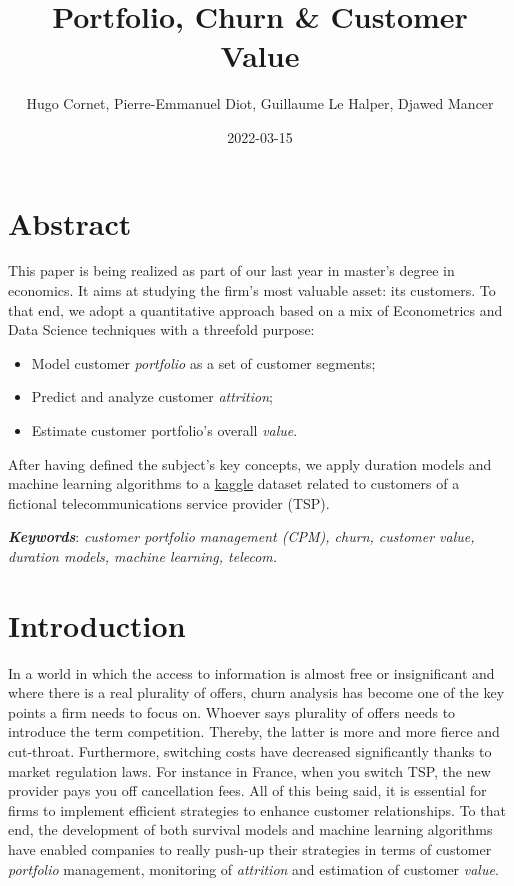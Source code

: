 \documentclass[
]{book}
\title{Portfolio, Churn \& Customer Value}
\author{Hugo Cornet, Pierre-Emmanuel Diot, Guillaume Le Halper, Djawed Mancer}
\date{2022-03-15}
\providecommand{\tightlist}{%
  \setlength{\itemsep}{0pt}\setlength{\parskip}{0pt}}
\begin{document}
\maketitle

{
\setcounter{tocdepth}{1}
\tableofcontents
}
\hypertarget{abstract}{%
\chapter*{Abstract}\label{abstract}}

This paper is being realized as part of our last year in master's degree in economics. It aims at studying the firm's most valuable asset: its customers. To that end, we adopt a quantitative approach based on a mix of Econometrics and Data Science techniques with a threefold purpose:

\begin{itemize}
\tightlist
\item
  Model customer \emph{portfolio} as a set of customer segments;
\item
  Predict and analyze customer \emph{attrition};
\item
  Estimate customer portfolio's overall \emph{value}.
\end{itemize}

After having defined the subject's key concepts, we apply duration models and machine learning algorithms to a \href{https://www.kaggle.com/yeanzc/telco-customer-churn-ibm-dataset}{kaggle} dataset related to customers of a fictional telecommunications service provider (TSP).

\textbf{\emph{Keywords}}: \emph{customer portfolio management (CPM), churn, customer value, duration models, machine learning, telecom.}

\hypertarget{intro}{%
\chapter{Introduction}\label{intro}}

In a world in which the access to information is almost free or insignificant and where there is a real plurality of offers, churn analysis has become one of the key points a firm needs to focus on. Whoever says plurality of offers needs to introduce the term competition. Thereby, the latter is more and more fierce and cut-throat. Furthermore, switching costs have decreased significantly thanks to market regulation laws. For instance in France, when you switch TSP, the new provider pays you off cancellation fees. All of this being said, it is essential for firms to implement efficient strategies to enhance customer relationships. To that end, the development of both survival models and machine learning algorithms have enabled companies to really push-up their strategies in terms of customer \emph{portfolio} management, monitoring of \emph{attrition} and estimation of customer \emph{value}.
\end{document}
